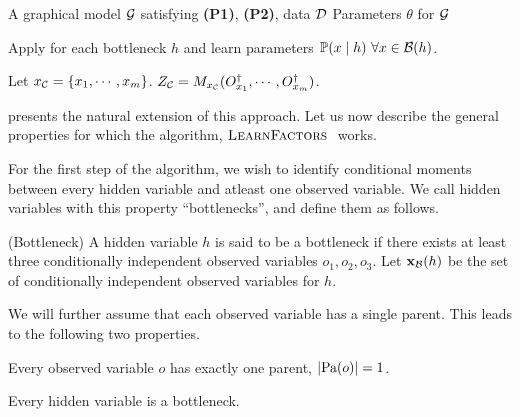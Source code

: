 \renewcommand{\algorithmicrequire}{\textbf{Input:}}
\renewcommand{\algorithmicensure}{\textbf{Output:}}
\begin{algorithm}
  \caption{\LearnFactors}
  \label{algo:directed}
  \begin{algorithmic}
    \REQUIRE A graphical model $\mathcal{G}$ satisfying \textbf{(P1)}, \textbf{(P2)}, data $\mathcal{D}$
    \ENSURE Parameters $\theta$ for $\mathcal{G}$

        \STATE Apply \TensorFactorize for each bottleneck $h$ and learn parameters $\mathbb{P}(x \mid h) ~ \forall x \in \mathcal{B}(h)$.

      \ENDFOR
      \STATE Let $x_{\mathcal{C}} = \{x_1, \cdots, x_m\}$.
      \STATE $Z_{\mathcal{C}} = M_{x_{\mathcal{C}}}( {O}^{\dagger}_{x_1}, \cdots, {O}^{\dagger}_{x_m} )$.
      \ENDFOR
  \end{algorithmic}
\end{algorithm}

 presents the natural extension of this approach.
Let us now describe the general properties for which the algorithm,
  $\textsc{LearnFactors}~$ works.

For the first step of the algorithm, we wish to identify conditional
  moments between every hidden variable and atleast one observed
  variable.
We call hidden variables with this property ``bottlenecks'',
  and define them as follows.
\begin{definition}(Bottleneck)
  A hidden variable $h$ is said to be a bottleneck if there exists at
    least three conditionally independent observed variables $o_1, o_2,
    o_3$. 
  Let $\mathbf{x}_{\mathcal{B}}(h)$ be the set of conditionally independent observed
    variables for $h$.
\end{definition}

We will further assume that each observed variable has a single parent. 
This leads to the following two properties.
\begin{property}
  \label{prop:unique-parent}
  Every observed variable $o$ has exactly one parent, $|\textrm{Pa}(o)| = 1$.
\end{property}
\begin{property}
  \label{prop:bottleneck}
  Every hidden variable is a bottleneck.
\end{property}

